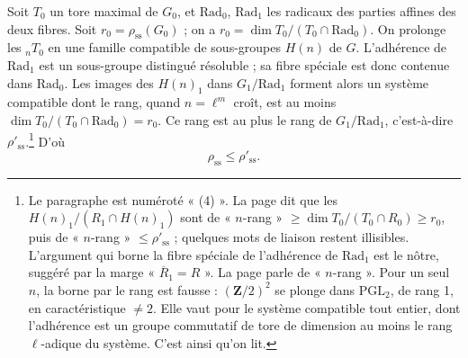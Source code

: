 \documentclass[11pt,a4paper]{article}
\begin{document}
Soit $T_{0}$ un tore maximal de $G_{0}$, et $\mathrm{Rad}_{0}$, $\mathrm{Rad}_{1}$
les radicaux des parties affines des deux fibres. Soit $r_{0} =
\rho_{\mathrm{ss}}(G_{0})$ ; on a $r_{0} = \dim T_{0}/(T_{0} \cap
\mathrm{Rad}_{0})$. On prolonge les ${}_{n}T_{0}$ en une famille compatible de
sous-groupes $H(n)$ de $G$. L'adhérence de $\mathrm{Rad}_{1}$ est un sous-groupe
distingué résoluble ; sa fibre spéciale est donc contenue dans
$\mathrm{Rad}_{0}$. Les images des $H(n)_{1}$ dans
$G_{1}/\mathrm{Rad}_{1}$ forment alors un système compatible dont le rang,
quand $n = \ell^{m}$ croît, est au moins $\dim T_{0}/(T_{0} \cap
\mathrm{Rad}_{0}) = r_{0}$. Ce rang est au plus le rang de
$G_{1}/\mathrm{Rad}_{1}$, c'est-à-dire $\rho'_{\mathrm{ss}}$.\footnote{Le paragraphe est numéroté « (4) ». La page dit que les
$H(n)_{1}/(R_{1} \cap H(n)_{1})$ sont de « $n$-rang » $\geqslant \dim
T_{0}/(T_{0} \cap R_{0}) \geqslant r_{0}$, puis de « $n$-rang »
$\leqslant \rho'_{\mathrm{ss}}$ ; quelques mots de liaison restent
illisibles. L'argument qui borne la fibre spéciale de
l'adhérence de $\mathrm{Rad}_{1}$ est le nôtre, suggéré par la marge
« $\overline{R}_{1} = R$ ». La page parle de « $n$-rang ». Pour un seul $n$,
la borne par le rang est fausse : $(\mathbf{Z}/2)^{2}$ se plonge dans
$\mathrm{PGL}_{2}$, de rang 1, en caractéristique $\neq 2$. Elle vaut pour le
système compatible tout entier, dont l'adhérence est un groupe commutatif de
tore de dimension au moins le rang $\ell$-adique du système. C'est ainsi qu'on
lit.} D'où
\[
  \rho_{\mathrm{ss}} \leqslant \rho'_{\mathrm{ss}} .
\]
\end{document}
